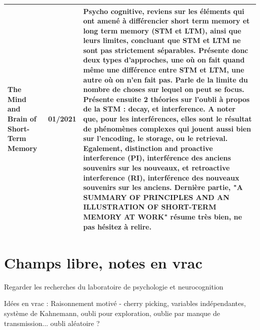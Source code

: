 \documentclass[french]{article}
\begin{document}
\begin{table}[ht!]
\begin{center}
\begin{tabular}{|p{}|p{}|p{}|}
            \\
            \hline

            The Mind and Brain of Short-Term Memory \cite{jonides_mind_2008}
            & 01/2021
            & Psycho cognitive, reviens sur les éléments qui ont amené à différencier short term memory et long term memory (STM et LTM), ainsi que leurs limites, concluant que STM et LTM ne sont pas strictement séparables. Présente donc deux types d'approches, une où on fait quand même une différence entre STM et LTM, une autre où on n'en fait pas. Parle de la limite du nombre de choses sur lequel on peut se focus. Présente ensuite 2 théories sur l'oubli à propos de la STM : decay, et interference. A noter que, pour les interférences, elles sont le résultat de phénomènes complexes qui jouent aussi bien sur l'encoding, le storage, ou le retrieval. Egalement, distinction and proactive interference (PI), interférence des anciens souvenirs sur les nouveaux, et retroactive interference (RI), interférence des nouveaux souvenirs sur les anciens. Dernière partie, "A SUMMARY OF PRINCIPLES AND AN ILLUSTRATION OF SHORT-TERM MEMORY AT WORK" résume très bien, ne pas hésitez à relire.

            \\
            \hline

        \end{tabular}
    \end{center}
    \end{table}

    \section{Champs libre, notes en vrac}

    Regarder les recherches du laboratoire de psychologie et neurocognition

    Idées en vrac :
    Raisonnement motivé - cherry picking, variables indépendantes, système de Kahnemann, oubli pour exploration, oublie par manque de transmission... oubli aléatoire ?

    
    \nocite{*}
    
    
\end{document}
